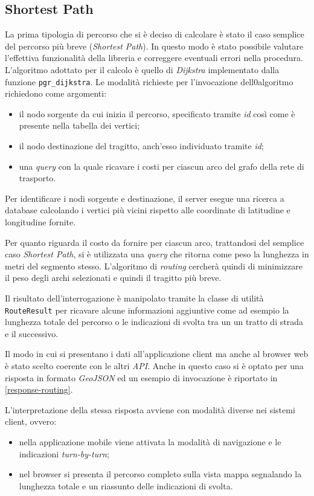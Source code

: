 \subsection{Shortest Path}
La prima tipologia di percorso che si è deciso di calcolare è stato il caso semplice del percorso più breve (\emph{Shortest Path}). In questo modo è stato possibile valutare l'effettiva funzionalità della libreria e correggere eventuali errori nella procedura.
L'algoritmo adottato per il calcolo è quello di \emph{Dijkstra} implementato dalla funzione \texttt{pgr\_dijkstra}. Le modalità richieste per l'invocazione dell0algoritmo richiedono come argomenti:
\begin{itemize}
\item il nodo sorgente da cui inizia il percorso, specificato tramite \emph{id} così come è presente nella tabella dei vertici;
\item il nodo destinazione del tragitto, anch'esso individuato tramite \emph{id};
\item una \emph{query} con la quale ricavare i costi per ciascun arco del grafo della rete di trasporto.
\end{itemize}
Per identificare i nodi sorgente e destinazione, il server esegue una ricerca a database calcolando i vertici più vicini rispetto alle coordinate di latitudine e longitudine fornite. 

Per quanto riguarda il costo da fornire per ciascun arco, trattandosi del semplice caso \emph{Shortest Path}, si è utilizzata una \emph{query} che ritorna come peso la lunghezza in metri del segmento stesso. L'algoritmo di \emph{routing} cercherà quindi di minimizzare il peso degli archi selezionati e quindi il tragitto più breve.

Il risultato dell'interrogazione è manipolato tramite la classe di utilità \texttt{RouteResult} per ricavare alcune informazioni aggiuntive come ad esempio la lunghezza totale del percorso o le indicazioni di svolta tra un un tratto di strada e il successivo. 

Il modo in cui si presentano i dati all'applicazione client ma anche al browser web è stato scelto coerente con le altri \emph{API}. Anche in questo caso si è optato per una risposta in formato \emph{GeoJSON} ed un esempio di invocazione è riportato in \ref{response-routing}.

L'interpretazione della stessa risposta avviene con modalità diverse nei sistemi client, ovvero:
\begin{itemize}
\item nella applicazione mobile viene attivata la modalità di navigazione e le indicazioni \emph{turn-by-turn};
\item nel browser si presenta il percorso completo sulla vista mappa segnalando la lunghezza totale e un riassunto delle indicazioni di svolta.
\end{itemize}

